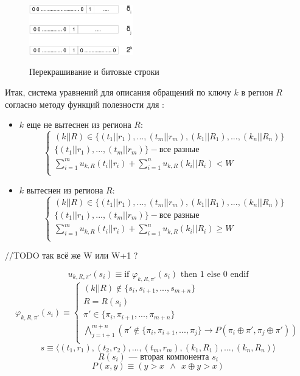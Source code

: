\begin{figure}[h] \center
  \includegraphics[width=0.4\textwidth]{2.theor/bits}\\
  \caption{Перекрашивание и битовые строки}\label{fig:bits}
\end{figure}

Итак, система уравнений для описания обращений по ключу $k$ в регион $R$
согласно методу функций полезности для \PseudoLRU:
\begin{itemize}
\item $k$ еще не вытеснен из региона $R$:
$$
\left\{\begin{array}{l}
(k||R) \in \{(t_1||r_1), ..., (t_m||r_m), (k_1||R_1), ..., (k_n||R_n)\}\\
\{(t_1||r_1), ..., (t_m||r_m)\} - \mbox{все разные}\\
\sum\limits_{i=1}^m u_{k,R}(t_i||r_i) + \sum\limits_{i=1}^n u_{k,R}(k_i||R_i) < W\\
\end{array} \right.
$$
\item $k$ вытеснен из региона $R$:
$$
\left\{\begin{array}{l} (k||R) \in \{(t_1||r_1), ..., (t_m||r_m), (k_1||R_1),
..., (k_n||R_n)\}\\
\{(t_1||r_1), ..., (t_m||r_m)\} - \mbox{все разные}\\
\sum\limits_{i=1}^m u_{k,R}(t_i||r_i) + \sum\limits_{i=1}^n u_{k,R}(k_i||R_i) \geqslant W\\
\end{array} \right.
$$
\end{itemize}

//TODO так всё же W или W+1 ?

$$u_{k,R,\pi'} (s_i) \equiv \mbox{if~} \varphi_{k,R,\pi'} (s_i) \mbox{~then 1 else 0 endif}$$
$$\varphi_{k,R,\pi'} (s_i) \equiv \left\{\begin{array}{l}
(k||R) \notin \{s_i, s_{i+1}, ..., s_{m+n}\}\\
R = R(s_i)\\
\pi' \in \{\pi_i, \pi_{i+1}, ..., \pi_{m+n}\}\\
\bigwedge\limits_{j = i+1}^{m+n} (\pi' \notin \{\pi_i, \pi_{i+1}, ..., \pi_j\} \rightarrow P(\pi_i \oplus \pi', \pi_j \oplus \pi'))\\
\end{array}\right.
$$
$$s \equiv \langle (t_1,r_1), (t_2,r_2), ..., (t_m,r_m), (k_1, R_1), ..., (k_n,R_n) \rangle$$
$$R(s_i) \mbox{~--- вторая компонента~} s_i$$
$$P(x, y) \equiv (y > x~~\wedge~~x \oplus y > x)$$


